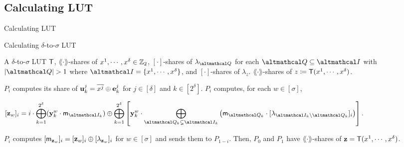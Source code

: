 \documentclass[../240906_cryptlab_flute.tex]{subfiles}
\begin{document}
\subsection{Calculating LUT}
\begin{frame}{Calculating LUT}
    \begin{block}{Calculating \(\delta\)-to-\(\sigma\) LUT}
        \begin{description}[Output]
            \ii[Input]
            A \(\delta\)-to-\(\sigma\) LUT \(\mathsf{T}\),
            \(\lang\cdot\rang\)-shares of \(x^1, \cdots, x^\delta \in \mathbb{Z}_2\),
            \([\cdot]\)-shares of \(\lambda_{\mcal{Q}}\) for each \(\mcal{Q} \subseteq \mcal{I}\)
            with \(|\mcal{Q}| > 1\) where \(\mcal{I} = \{x^1,\cdots,x^\delta\}\), and
            \([\cdot]\)-shares of \(\lambda_z\).
            \ii[Output]
            \(\lang\cdot\rang\)-shares of \(z \coloneqq \mathsf{T}(x^1, \cdots, x^\delta)\).
        \end{description}
        \pause
        \begin{enumerate}
            \ii
            \(P_i\) computes its share of \(\boldsymbol{\mathbf{u}}^j_k = \overline{x^j} \oplus \boldsymbol{\mathbf{e}}^j_k\)
            for \(j \in [\delta]\) and \(k \in [2^\delta]\).
            \pause
            \ii
            \(P_i\) computes, for each \(w \in [\sigma]\),
            \centerline{%
                \(\displaystyle
                [\vec{z}_w]_i = i \cdot \bigoplus_{k=1}^{2^\delta} (\vec{y}^w_k \cdot \msf{m}_{\mcal{I}_k})
                \oplus \bigoplus_{k=1}^{2^\delta} \left[
                    \vec{y}^w_k \cdot \bigoplus_{\mcal{Q}_k \subsetneq \mcal{I}_k} \big(
                    \msf{m}_{\mcal{Q}_k} \cdot [\lambda_{\mcal{I}_k \setminus \mcal{Q}_k}]_i \big)
                \right].
                \)
            }
            \pause
            \ii
            \(P_i\) computes \([\mathsf{m}_{\boldsymbol{\mathbf{z}}_w}]_i = [\boldsymbol{\mathbf{z}}_w]_i \oplus [\lambda_{\boldsymbol{\mathbf{z}}_w}]_i\)
            for \(w \in [\sigma]\) and sends them to \(P_{1-i}\).
            \ii
            Then, \(P_0\) and \(P_1\) have \(\lang\cdot\rang\)-shares of \(\boldsymbol{\mathbf{z}} = \mathsf{T}(x^1, \cdots, x^\delta)\).
        \end{enumerate}
    \end{block}
\end{frame}
\end{document}
